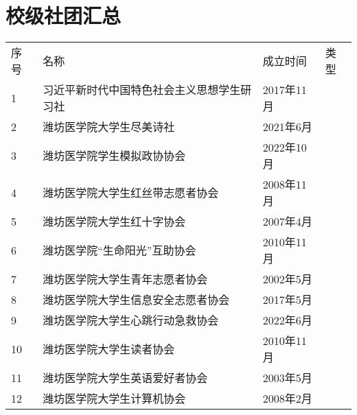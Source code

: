 \chapter[校级社团汇总]{校级社团汇总}
\label{community_summary}
\begin{table}[H]
    \setlength{\leftskip}{0pt plus 1fil minus \marginparwidth}
    \setlength{\rightskip}{\leftskip}
    \vspace*{8em}
    \begin{tabular}{|>{\centering\arraybackslash}p{2em}|>{\centering\arraybackslash}p{21em}|%
        >{\centering\arraybackslash}p{6em}|>{\centering\arraybackslash}p{5em}|}
        \Xhline{1.2pt}
        序号 & 名称                    & 成立时间     & 类型                     \\
        \Xhline{1.2pt}
        1  & 习近平新时代中国特色社会主义思想学生研习社 & 2017年11月 & \multirow{3}{*}{思想政治类} \\
        \cline{1-3}
        2  & 潍坊医学院大学生尽美诗社          & 2021年6月  &                        \\
        \cline{1-3}
        3  & 潍坊医学院学生模拟政协协会         & 2022年10月 &                        \\
        \Xhline{1.2pt}
        4  & 潍坊医学院大学生红丝带志愿者协会      & 2008年11月 & \multirow{6}{*}{志愿公益类} \\
        \cline{1-3}
        5  & 潍坊医学院大学生红十字协会         & 2007年4月  &                        \\
        \cline{1-3}
        6  & 潍坊医学院“生命阳光”互助协会       & 2010年11月 &                        \\
        \cline{1-3}
        7  & 潍坊医学院大学生青年志愿者协会       & 2002年5月  &                        \\
        \cline{1-3}
        8  & 潍坊医学院大学生信息安全志愿者协会     & 2017年5月  &                        \\
        \cline{1-3}
        9  & 潍坊医学院大学生心跳行动急救协会      & 2022年6月  &                        \\
        \Xhline{1.2pt}
        10 & 潍坊医学院大学生读者协会          & 2010年11月 & \multirow{5}{*}{学术科技类} \\
        \cline{1-3}
        11 & 潍坊医学院大学生英语爱好者协会       & 2003年5月  &                        \\
        \cline{1-3}
        12 & 潍坊医学院大学生计算机协会         & 2008年2月  &                        \\

\end{tabular}
\end{table}
